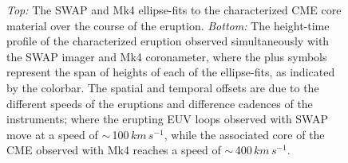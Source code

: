 \documentclass[namedreferences]{solarphysics}
\begin{document}
\begin{article}
\begin{figure}[t]
\caption{\emph{Top:} The SWAP and Mk4 ellipse-fits to the characterized CME core material over the course of the eruption. \emph{Bottom:} The height-time profile of the characterized eruption observed simultaneously with the SWAP imager and Mk4 coronameter, where the plus symbols represent the span of heights of each of the ellipse-fits, as indicated by the colorbar. The spatial and temporal offsets are due to the different speeds of the eruptions and difference cadences of the instruments; where the erupting EUV loops observed with SWAP move at a speed of $\sim$\,100$\,km\,s^{-1}$, while the associated core of the CME observed with Mk4 reaches a speed of $\sim$\,400$\,km\,s^{-1}$.}
\label{ell_heights_inner}
\end{figure}


\end{article}
\end{document}
